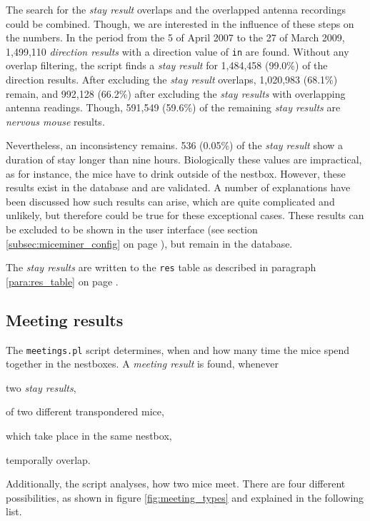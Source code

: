 The search for the \textit{stay result} overlaps and the overlapped antenna recordings could be combined. Though, we are interested in the influence of these steps on the numbers. In the period from the 5 of April 2007 to the 27 of March 2009, 1,499,110 \textit{direction results} with a direction value of \lstinline|in| are found. Without any overlap filtering, the script finds a \textit{stay result} for 1,484,458 (99.0\%) of the direction results. After excluding the \textit{stay result} overlaps, 1,020,983 (68.1\%) remain, and 992,128 (66.2\%) after excluding the \textit{stay results} with overlapping antenna readings. Though, 591,549 (59.6\%) of the remaining \textit{stay results} are \textit{nervous mouse} results.

Nevertheless, an inconsistency remains. 536 (0.05\%) of the \textit{stay result} show a duration of stay longer than nine hours. Biologically these values are impractical, as for instance, the mice have to drink outside of the nestbox. However, these results exist in the database and are validated. A number of explanations have been discussed how such results can arise, which are quite complicated and unlikely, but therefore could be true for these exceptional cases. These results can be excluded to be shown in the user interface (see section \ref{subsec:miceminer_config} on page \pageref{subsec:miceminer_config}), but remain in the database.     

The \textit{stay results} are written to the \lstinline|res| table as described in paragraph \ref{para:res_table} on page \pageref{para:res_table}.

\subsection{Meeting results}
\label{subsec:meetingres}

The \lstinline|meetings.pl| script determines, when and how many time the mice spend together in the nestboxes. A \textit{meeting result} is found, whenever

\begin{mylist}
\item two \textit{stay results},
\item of two different transpondered mice,
\item which take place in the same nestbox,
\item temporally overlap.
\end{mylist}

Additionally, the script analyses, how two mice meet. There are four different possibilities, as shown in figure \ref{fig:meeting_types} and explained in the following list.

